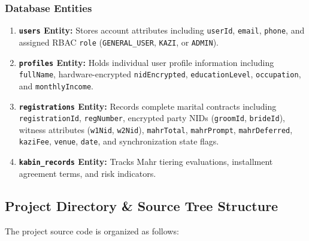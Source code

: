 \documentclass[12pt,a4paper]{article}
\begin{document}
	\subsubsection{Database Entities}
	\begin{enumerate}
		\item \textbf{\texttt{users} Entity:} Stores account attributes including \texttt{userId}, \texttt{email}, \texttt{phone}, and assigned RBAC \texttt{role} (\texttt{GENERAL\_USER}, \texttt{KAZI}, or \texttt{ADMIN}).
		\item \textbf{\texttt{profiles} Entity:} Holds individual user profile information including \texttt{fullName}, hardware-encrypted \texttt{nidEncrypted}, \texttt{educationLevel}, \texttt{occupation}, and \texttt{monthlyIncome}.
		\item \textbf{\texttt{registrations} Entity:} Records complete marital contracts including \texttt{registrationId}, \texttt{regNumber}, encrypted party NIDs (\texttt{groomId}, \texttt{brideId}), witness attributes (\texttt{w1Nid}, \texttt{w2Nid}), \texttt{mahrTotal}, \texttt{mahrPrompt}, \texttt{mahrDeferred}, \texttt{kaziFee}, \texttt{venue}, \texttt{date}, and synchronization state flags.
		\item \textbf{\texttt{kabin\_records} Entity:} Tracks Mahr tiering evaluations, installment agreement terms, and risk indicators.
	\end{enumerate}
	
	\subsection{Project Directory \& Source Tree Structure}
	The project source code is organized as follows:
	
\end{document}
